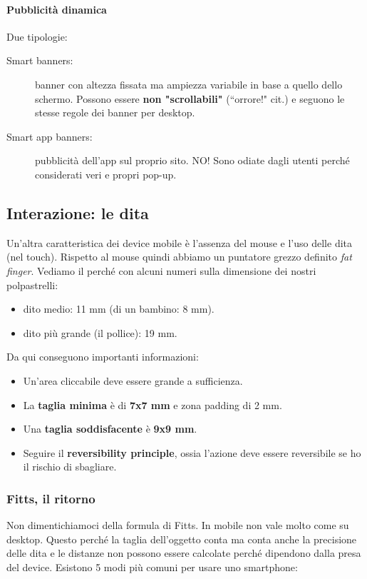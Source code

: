 				\paragraph{Pubblicità dinamica}
					Due tipologie:
					\begin{description}
						\item[Smart banners:] banner con altezza fissata ma ampiezza variabile in base a quello dello schermo. Possono essere \textbf{non "scrollabili"} (``orrore!" cit.) e seguono le stesse regole dei banner per desktop.
						\item[Smart app banners:] pubblicità dell'app sul proprio sito. NO! Sono odiate dagli utenti perché considerati veri e propri pop-up.
					\end{description}
					
		\subsection{Interazione: le dita}
			Un'altra caratteristica dei device mobile è l'assenza del mouse e l'uso delle dita (nel touch). Rispetto al mouse quindi abbiamo un puntatore grezzo definito \emph{fat finger}. Vediamo il perché con alcuni numeri sulla dimensione dei nostri polpastrelli:
			\begin{itemize}
				\item dito medio: 11 mm (di un bambino: 8 mm).
				\item dito più grande (il pollice): 19 mm.
			\end{itemize}
			Da qui conseguono importanti informazioni:
			\begin{itemize}
				\item Un'area cliccabile deve essere grande a sufficienza.
				\item La \textbf{taglia minima} è di \textbf{7x7 mm} e zona padding di 2 mm.
				\item Una \textbf{taglia soddisfacente} è \textbf{9x9 mm}. 
				\item Seguire il \textbf{reversibility principle}, ossia l'azione deve essere reversibile se ho il rischio di sbagliare.
			\end{itemize}
				
				\subsubsection{Fitts, il ritorno}
					Non dimentichiamoci della formula di Fitts. In mobile non vale molto come su desktop. Questo perché la taglia dell'oggetto conta ma conta anche la precisione delle dita e le distanze non possono essere calcolate perché dipendono dalla presa del device. Esistono 5 modi più comuni per usare uno smartphone:
					
